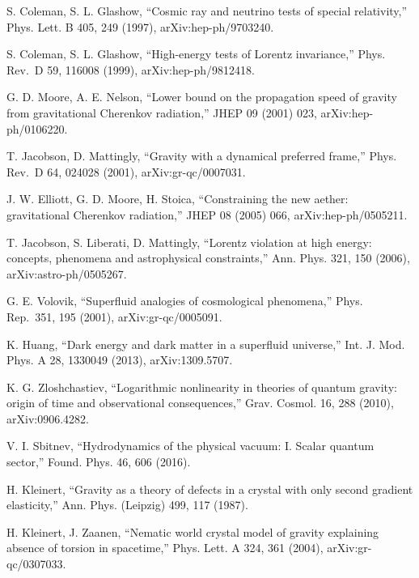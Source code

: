 \documentclass[
  11pt,
]{article}
\begin{document}
\begin{list}{}{\setlength{\leftmargin}{2.5em}\setlength{\labelwidth}{2.2em}\setlength{\labelsep}{0.3em}\setlength{\itemsep}{1pt}\setlength{\parsep}{0pt}\setlength{\topsep}{2pt}}
\item[{[11]}] S. Coleman, S. L. Glashow, ``Cosmic ray and neutrino tests
of special relativity,'' Phys. Lett. B 405, 249 (1997),
arXiv:hep-ph/9703240.

\item[{[12]}] S. Coleman, S. L. Glashow, ``High-energy tests of Lorentz
invariance,'' Phys. Rev.~D 59, 116008 (1999), arXiv:hep-ph/9812418.

\item[{[13]}] G. D. Moore, A. E. Nelson, ``Lower bound on the
propagation speed of gravity from gravitational Cherenkov radiation,''
JHEP 09 (2001) 023, arXiv:hep-ph/0106220.

\item[{[14]}] T. Jacobson, D. Mattingly, ``Gravity with a dynamical
preferred frame,'' Phys. Rev.~D 64, 024028 (2001), arXiv:gr-qc/0007031.

\item[{[15]}] J. W. Elliott, G. D. Moore, H. Stoica, ``Constraining the
new aether: gravitational Cherenkov radiation,'' JHEP 08 (2005) 066,
arXiv:hep-ph/0505211.

\item[{[16]}] T. Jacobson, S. Liberati, D. Mattingly, ``Lorentz
violation at high energy: concepts, phenomena and astrophysical
constraints,'' Ann. Phys. 321, 150 (2006), arXiv:astro-ph/0505267.

\item[{[17]}] G. E. Volovik, ``Superfluid analogies of cosmological
phenomena,'' Phys. Rep.~351, 195 (2001), arXiv:gr-qc/0005091.

\item[{[18]}] K. Huang, ``Dark energy and dark matter in a superfluid
universe,'' Int. J. Mod. Phys. A 28, 1330049 (2013), arXiv:1309.5707.

\item[{[19]}] K. G. Zloshchastiev, ``Logarithmic nonlinearity in
theories of quantum gravity: origin of time and observational
consequences,'' Grav. Cosmol. 16, 288 (2010), arXiv:0906.4282.

\item[{[20]}] V. I. Sbitnev, ``Hydrodynamics of the physical vacuum: I.
Scalar quantum sector,'' Found. Phys. 46, 606 (2016).

\item[{[21]}] H. Kleinert, ``Gravity as a theory of defects in a crystal
with only second gradient elasticity,'' Ann. Phys. (Leipzig) 499, 117
(1987).

\item[{[22]}] H. Kleinert, J. Zaanen, ``Nematic world crystal model of
gravity explaining absence of torsion in spacetime,'' Phys. Lett. A 324,
361 (2004), arXiv:gr-qc/0307033.


\end{list}
\end{document}
